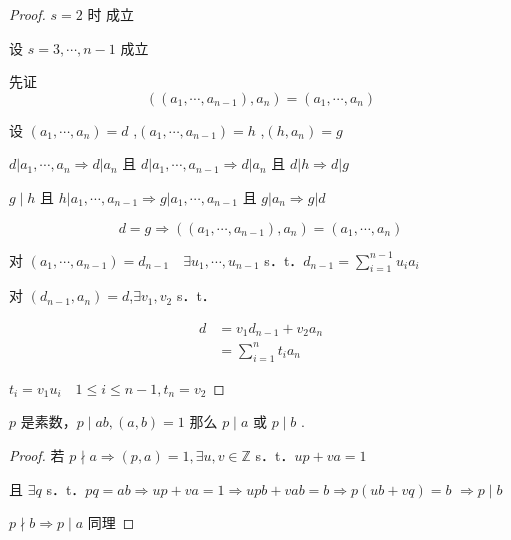 \begin{proof}
	$s=2$ 时 成立
	
	设 $s=3, \cdots, n-1$ 成立
	
	先证
	$$
	\left(\left(a_1, \cdots, a_{n-1}\right), a_n\right)=\left(a_1, \cdots, a_n\right)
	$$
	
	设 $\left(a_1, \cdots, a_n\right)=d$ ,$\left(a_1, \cdots, a_{n-1}\right)=h$ ,$ \left(h, a_n\right)=g$
	
	
	$d\left|a_1, \cdots, a_n \Rightarrow d\right| a_n$ 且 $d\left|a_1, \cdots, a_{n-1} \Rightarrow d\right| a_n$ 且 $d|h \Rightarrow d| g$
	
	
	$g \mid h$ 且 $h\left|a_1, \cdots, a_{n-1} \Rightarrow g\right| a_1, \cdots, a_{n-1}$ 且 $g\left|a_n \Rightarrow g\right| d$
	
	$$
	d=g \Rightarrow\left(\left(a_1, \cdots, a_{n-1}\right), a_n\right)=\left(a_1, \cdots, a_n\right)
	$$
	
	对 $\left(a_1, \cdots, a_{n-1}\right)=d_{n-1} \quad \exists u_1, \cdots, u_{n-1}$ s．t．$d_{n-1}=\sum_{i=1}^{n-1} u_i a_i$
	
	对 $\left(d _{n-1}, a_n\right)=d $,$ \exists v_1, v_2$ s．t．
	
	$$\begin{aligned}
		d & =v_1 d_{n-1}+v_2 a_n \\
		& =\sum_{i=1}^n t_i a_n
	\end{aligned}$$
	
	$t_i=v_1 u_i \quad 1 \leqslant i \leqslant n-1 , t_n=v_2$
	
	
\end{proof}
\begin{corollary}
	$p$ 是素数，$p \mid a b,(a, b)=1$ 那么 $p \mid a$ 或 $p \mid b$ .
\end{corollary}
\begin{proof}
	若 $p \nmid a\Rightarrow(p, a)=1, \exists u, v \in \mathbb{Z}$ s．t．$u p+v a=1$
	
	且 $\exists q$ s．t．$p q=a b \Rightarrow u p+v a=1 \Rightarrow u p b+v a b=b \Rightarrow p(u b+v q)=b$
	$\Rightarrow p \mid b$
	
	$p\nmid b \Rightarrow p \mid a$ 同理
	
\end{proof}

